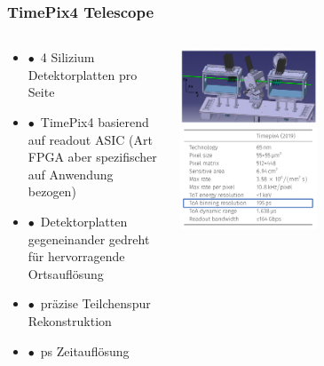 \documentclass[aspectratio=1610, 12pt, xcolor=dvipsnames]{beamer}
\begin{document}
\begin{frame}\frametitle{TimePix4 Telescope}
  \begin{columns}
    \begin{column}[c]{0.48\textwidth}
      \begin{itemize}
        \item $\bullet$\, 4 Silizium Detektorplatten pro Seite
        \item $\bullet$\, TimePix4 basierend auf readout ASIC (Art FPGA aber spezifischer auf Anwendung bezogen)
        \item $\bullet$\, Detektorplatten gegeneinander gedreht für hervorragende Ortsauflösung
        \item $\bullet$\, \to präzise Teilchenspur Rekonstruktion
        \item $\bullet$\,  ps Zeitauflösung
      \end{itemize}
    \end{column}
    \begin{column}[c]{0.48\textwidth}
      \includegraphics[width=0.5\textwidth]{plots/timepix4.png}
      \includegraphics[width=0.5\textwidth]{plots/lumi_res.png}
    \end{column}
  \end{columns}
\end{frame}

%
%
\end{document}
